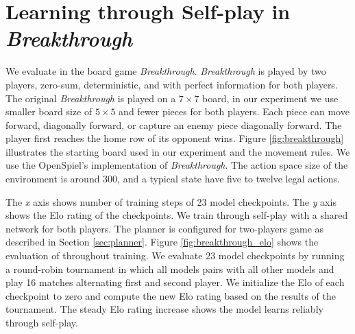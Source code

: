 \section{Learning through Self-play in \textit{Breakthrough}} \label{sec:exp:breakthrough}

We evaluate \moozi in the board game \textit{Breakthrough}.
\textit{Breakthrough} is played by two players, zero-sum, deterministic, and with perfect information for both players.
The original \textit{Breakthrough} is played on a $7 \times 7$ board, in our experiment we use smaller board size of \(5 \times 5\) and fewer pieces for both players.
Each piece can move forward, diagonally forward, or capture an enemy piece diagonally forward.
The player first reaches the home row of its opponent wins.
Figure \ref{fig:breakthrough} illustrates the starting board used in our experiment and the movement rules.
We use the OpenSpiel's implementation of \textit{Breakthrough}.
The action space size of the environment is around 300, and a typical state have five to twelve legal actions.

{
    The \textit{x} axis shows number of training steps of 23 model checkpoints.
    The \textit{y} axis shows the Elo rating of the checkpoints.
}
We train \moozi through self-play with a shared network for both players.
The planner is configured for two-players game as described in Section \ref{sec:planner}.
Figure \ref{fig:breakthrough_elo} shows the evaluation of \moozi throughout training.
We evaluate 23 model checkpoints by running a round-robin tournament in which all models pairs with all other models and play 16 matches alternating first and second player.
We initialize the Elo of each checkpoint to zero and compute the new Elo rating based on the results of the tournament.
The steady Elo rating increase shows the model learns reliably through self-play.

